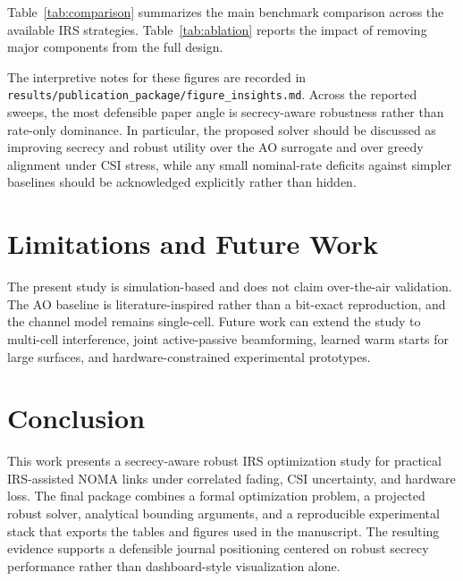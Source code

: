 \documentclass[journal]{IEEEtran}
\begin{document}
Table~\ref{tab:comparison} summarizes the main benchmark comparison across the available IRS strategies. Table~\ref{tab:ablation} reports the impact of removing major components from the full design.







The interpretive notes for these figures are recorded in \texttt{results/publication\_package/figure\_insights.md}. Across the reported sweeps, the most defensible paper angle is secrecy-aware robustness rather than rate-only dominance. In particular, the proposed solver should be discussed as improving secrecy and robust utility over the AO surrogate and over greedy alignment under CSI stress, while any small nominal-rate deficits against simpler baselines should be acknowledged explicitly rather than hidden.

\section{Limitations and Future Work}
The present study is simulation-based and does not claim over-the-air validation. The AO baseline is literature-inspired rather than a bit-exact reproduction, and the channel model remains single-cell. Future work can extend the study to multi-cell interference, joint active-passive beamforming, learned warm starts for large surfaces, and hardware-constrained experimental prototypes.

\section{Conclusion}
This work presents a secrecy-aware robust IRS optimization study for practical IRS-assisted NOMA links under correlated fading, CSI uncertainty, and hardware loss. The final package combines a formal optimization problem, a projected robust solver, analytical bounding arguments, and a reproducible experimental stack that exports the tables and figures used in the manuscript. The resulting evidence supports a defensible journal positioning centered on robust secrecy performance rather than dashboard-style visualization alone.
\end{document}
